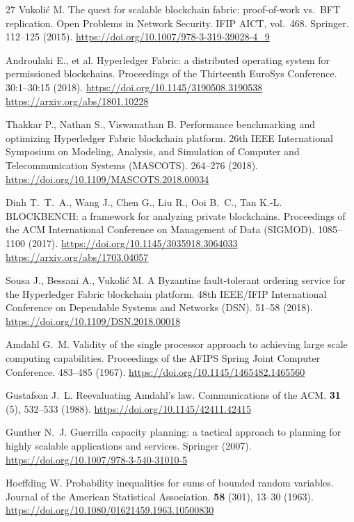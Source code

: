 \begin{thebibliography}{27}
Vukoli\'{c} M. The quest for scalable blockchain fabric: proof-of-work vs.\ BFT
replication. Open Problems in Network Security. IFIP AICT, vol.~468. Springer.
112--125 (2015).
\url{https://doi.org/10.1007/978-3-319-39028-4_9}

Androulaki E., et al. Hyperledger Fabric: a distributed operating system for
permissioned blockchains. Proceedings of the Thirteenth EuroSys Conference.
30:1--30:15 (2018).
\url{https://doi.org/10.1145/3190508.3190538}
\url{https://arxiv.org/abs/1801.10228}

Thakkar P., Nathan S., Viswanathan B. Performance benchmarking and optimizing
Hyperledger Fabric blockchain platform. 26th IEEE International Symposium on
Modeling, Analysis, and Simulation of Computer and Telecommunication Systems
(MASCOTS). 264--276 (2018).
\url{https://doi.org/10.1109/MASCOTS.2018.00034}

Dinh T.~T.~A., Wang J., Chen G., Liu R., Ooi B.~C., Tan K.-L. BLOCKBENCH: a
framework for analyzing private blockchains. Proceedings of the ACM
International Conference on Management of Data (SIGMOD). 1085--1100 (2017).
\url{https://doi.org/10.1145/3035918.3064033}
\url{https://arxiv.org/abs/1703.04057}

Sousa J., Bessani A., Vukoli\'{c} M. A Byzantine fault-tolerant ordering service
for the Hyperledger Fabric blockchain platform. 48th IEEE/IFIP International
Conference on Dependable Systems and Networks (DSN). 51--58 (2018).
\url{https://doi.org/10.1109/DSN.2018.00018}

Amdahl G.~M. Validity of the single processor approach to achieving large scale
computing capabilities. Proceedings of the AFIPS Spring Joint Computer
Conference. 483--485 (1967).
\url{https://doi.org/10.1145/1465482.1465560}

Gustafson J.~L. Reevaluating Amdahl's law. Communications of the ACM.
\textbf{31} (5), 532--533 (1988).
\url{https://doi.org/10.1145/42411.42415}

Gunther N.~J. Guerrilla capacity planning: a tactical approach to planning for
highly scalable applications and services. Springer (2007).
\url{https://doi.org/10.1007/978-3-540-31010-5}

Hoeffding W. Probability inequalities for sums of bounded random variables.
Journal of the American Statistical Association. \textbf{58} (301), 13--30
(1963).
\url{https://doi.org/10.1080/01621459.1963.10500830}


\end{thebibliography}
